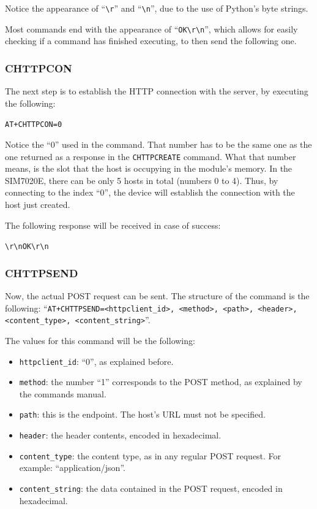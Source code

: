 Notice the appearance of ``\texttt{\textbackslash r}'' and ``\texttt{\textbackslash n}'', due to 
the use of Python's byte strings.

Most commands end with the appearance of ``\texttt{OK\textbackslash r\textbackslash n}'', which 
allows for easily checking if a command has finished executing, to then send the following one.

\subsubsection*{CHTTPCON}
The next step is to establish the HTTP connection with the server, by executing the following:
\begin{center}
	\texttt{AT+CHTTPCON=0}
\end{center}

Notice the ``0'' used in the command. That number has to be the same one as the one returned as a 
response in the \texttt{CHTTPCREATE} command. What that number means, is the slot that the host is 
occupying in the module's memory. In the SIM7020E, there can be only 5 hosts in total (numbers 0 
to 4). Thus, by connecting to the index ``0'', the device will establish the connection with the 
host just created.

The following response will be received in case of success:
\begin{center}
	\texttt{\textbackslash r\textbackslash nOK\textbackslash r\textbackslash n}
\end{center}

\subsubsection*{CHTTPSEND}
Now, the actual POST request can be sent. The structure of the command is the following: 
``\texttt{AT+CHTTPSEND=<httpclient\_id>, <method>, <path>, <header>,\\<content\_type>, 
<content\_string>}''.

The values for this command will be the following:
\begin{itemize}
	\item \texttt{httpclient\_id}: ``0'', as explained before.
	\item \texttt{method}: the number ``1'' corresponds to the POST method, as explained by the 
	commands manual.
	\item \texttt{path}: this is the endpoint. The host's URL must not be specified.
	\item \texttt{header}: the header contents, encoded in hexadecimal.
	\item \texttt{content\_type}: the content type, as in any regular POST request. For example: 
	``application/json''.
	\item \texttt{content\_string}: the data contained in the POST request, encoded in hexadecimal.
\end{itemize}

